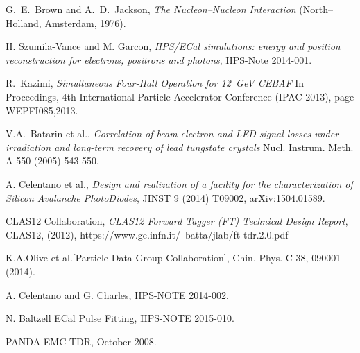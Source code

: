 \documentclass[12pt]{report}
\begin{document}
\begin{thebibliography}{99}

  

  G.~E.~Brown and A.~D.~Jackson, {\it The
Nucleon--Nucleon Interaction} (North--Holland, Amsterdam, 1976).

 H. Szumila-Vance and M. Garcon, {\it HPS/ECal simulations: energy and
position reconstruction for electrons, positrons and photons}, HPS-Note 2014-001.

 R.~Kazimi, {\it Simultaneous Four-Hall Operation for 12~GeV CEBAF} In Proceedings, 4th International Particle Accelerator Conference (IPAC 2013), page WEPFI085,2013.

 V.A.~Batarin et al., {\it Correlation of beam electron and LED signal losses under irradiation and long-term recovery of lead tungstate crystals} Nucl. Instrum. Meth. A 550 (2005) 543-550.

 A. Celentano et al., {\it Design and realization of a facility for the characterization of Silicon Avalanche PhotoDiodes}, JINST 9 (2014) T09002, arXiv:1504.01589.

 CLAS12 Collaboration, {\it CLAS12 Forward Tagger (FT) Technical Design Report}, CLAS12, (2012), https://www.ge.infn.it/~batta/jlab/ft-tdr.2.0.pdf

 K.A.Olive et al.[Particle Data Group Collaboration], Chin. Phys. C 38, 090001 (2014).

 A. Celentano and G. Charles, HPS-NOTE 2014-002.

 N. Baltzell ECal Pulse Fitting, HPS-NOTE 2015-010.

 PANDA EMC-TDR, October 2008.


\end{thebibliography}
\end{document}
